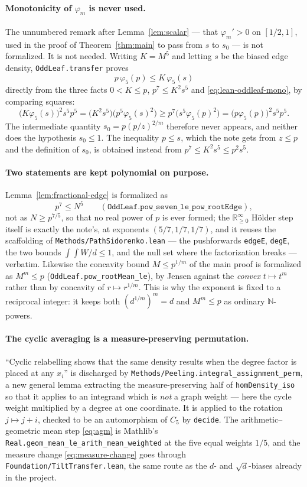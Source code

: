 \documentclass[11pt]{article}
\begin{document}
\paragraph{Monotonicity of $\varphi_m$ is never used.}
The unnumbered remark after Lemma~\ref{lem:scalar} --- that $\varphi_m'>0$ on
$[1/2,1]$, used in the proof of Theorem~\ref{thm:main} to pass from $s$ to
$s_0$ --- is not formalized.  It is not needed.  Writing $K=M^5$ and letting $s$
be the biased edge density, \texttt{OddLeaf.transfer} proves
\[
 p\,\varphi_5(p)\leq K\,\varphi_5(s)
\]
directly from the three facts $0<K\leq p$, $p^7\leq K^2s^5$ and
\eqref{eq:lean-oddleaf-mono}, by comparing squares:
\[
 \bigl(K\varphi_5(s)\bigr)^2s^5p^5
 =\bigl(K^2s^5\bigr)\bigl(p^5\varphi_5(s)^2\bigr)
 \geq p^7\bigl(s^5\varphi_5(p)^2\bigr)
 =\bigl(p\varphi_5(p)\bigr)^2s^5p^5 .
\]
The intermediate quantity $s_0=p(p/z)^{2/m}$ therefore never appears, and
neither does the hypothesis $s_0\leq1$.  The inequality $p\leq s$, which the
note gets from $z\leq p$ and the definition of $s_0$, is obtained instead from
$p^7\leq K^2s^5\leq p^2s^5$.

\paragraph{Two statements are kept polynomial on purpose.}
Lemma~\ref{lem:fractional-edge} is formalized as
\[
 p^7\leq N^5
 \qquad(\texttt{OddLeaf.pow\_seven\_le\_pow\_rootEdge}),
\]
not as $N\geq p^{7/5}$, so that no real power of $p$ is ever formed; the
$\mathbb{R}_{\geq0}^\infty$ Hölder step itself is exactly the note's, at
exponents $(5/7,1/7,1/7)$, and it reuses the scaffolding of
\texttt{Methods/PathSidorenko.lean} --- the pushforwards \texttt{edgeE},
\texttt{degE}, the two bounds $\int\!\!\int W/d\leq1$, and the null set where
the factorization breaks --- verbatim.  Likewise the concavity bound
$M\leq p^{1/m}$ of the main proof is formalized as $M^m\leq p$
(\texttt{OddLeaf.pow\_rootMean\_le}), by Jensen against the \emph{convex}
$t\mapsto t^m$ rather than by concavity of $r\mapsto r^{1/m}$.  This is why the
exponent is fixed to a reciprocal integer: it keeps both $(d^{1/m})^m=d$ and
$M^m\leq p$ as ordinary $\mathbb{N}$-powers.

\paragraph{The cyclic averaging is a measure-preserving permutation.}
``Cyclic relabelling shows that the same density results when the degree factor
is placed at any $x_i$'' is discharged by
\texttt{Methods/Peeling.integral\_assignment\_perm}, a new general lemma
extracting the measure-preserving half of \texttt{homDensity\_iso} so that it
applies to an integrand which is \emph{not} a graph weight --- here the cycle
weight multiplied by a degree at one coordinate.  It is applied to the rotation
$j\mapsto j+i$, checked to be an automorphism of $C_5$ by \texttt{decide}.  The
arithmetic--geometric mean step \eqref{eq:agm} is Mathlib's
\texttt{Real.geom\_mean\_le\_arith\_mean\_weighted} at the five equal weights
$1/5$, and the measure change \eqref{eq:measure-change} goes through
\texttt{Foundation/TiltTransfer.lean}, the same route as the $d$- and
$\sqrt d$-biases already in the project.
\end{document}
